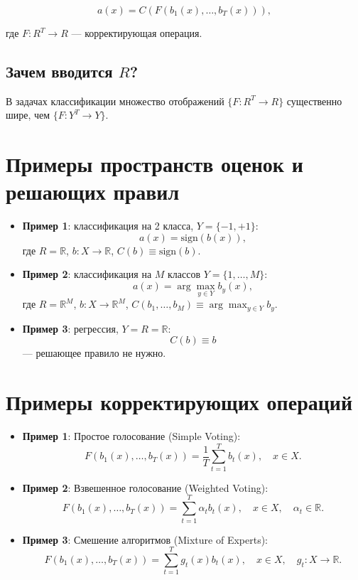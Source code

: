 \[ a(x) = C(F(b_1(x), \ldots, b_T(x))), \]

где $F: R^T \rightarrow R$ — корректирующая операция.

\subsection*{Зачем вводится $R$?}
В задачах классификации множество отображений $\{F : R^T \rightarrow R\}$ существенно шире, чем $\{F : Y^T \rightarrow Y\}$.

\section*{Примеры пространств оценок и решающих правил}

\begin{itemize}
    \item \textbf{Пример 1}: классификация на 2 класса, $Y = \{-1, +1\}$:
    \[
    a(x) = \text{sign}(b(x)),
    \]
    где $R = \mathbb{R}$, $b: X \rightarrow \mathbb{R}$, $C(b) \equiv \text{sign}(b)$.
    
    \item \textbf{Пример 2}: классификация на $M$ классов $Y = \{1, \ldots, M\}$:
    \[
    a(x) = \arg \max_{y \in Y} b_y(x),
    \]
    где $R = \mathbb{R}^M$, $b: X \rightarrow \mathbb{R}^M$, $C(b_1, \ldots, b_M) \equiv \arg \max_{y \in Y} b_y$.
    
    \item \textbf{Пример 3}: регрессия, $Y = R = \mathbb{R}$:
    \[
    C(b) \equiv b
    \]
    — решающее правило не нужно.
\end{itemize}

\section*{Примеры корректирующих операций}

\begin{itemize}
    \item \textbf{Пример 1}: Простое голосование (Simple Voting):
    \[
    F(b_1(x), \ldots, b_T(x)) = \frac{1}{T} \sum_{t=1}^T b_t(x), \quad x \in X.
    \]

    \item \textbf{Пример 2}: Взвешенное голосование (Weighted Voting):
    \[
    F(b_1(x), \ldots, b_T(x)) = \sum_{t=1}^T \alpha_t b_t(x), \quad x \in X, \quad \alpha_t \in \mathbb{R}.
    \]

    \item \textbf{Пример 3}: Смешение алгоритмов (Mixture of Experts):
    \[
    F(b_1(x), \ldots, b_T(x)) = \sum_{t=1}^T g_t(x) b_t(x), \quad x \in X, \quad g_t: X \rightarrow \mathbb{R}.
    \]
\end{itemize}

